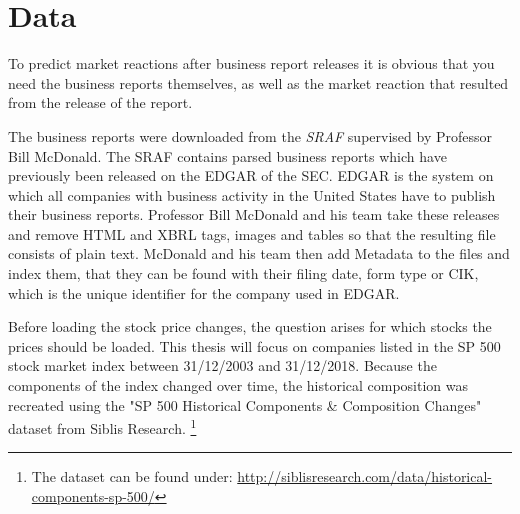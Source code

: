 \chapter{Data}\label{ch:data}

To predict market reactions after business report releases it is obvious that you need the business reports themselves, as well as the market reaction that resulted from the release of the report.

The business reports were downloaded from the \textit{\ac{SRAF}} supervised by Professor Bill McDonald.
The \ac{SRAF} contains parsed business reports which have previously been released on the \ac{EDGAR} of the \ac{SEC}.
\ac{EDGAR} is the system on which all companies with business activity in the United States have to publish their business reports.
Professor Bill McDonald and his team take these releases and remove HTML and \ac{XBRL} tags, images and tables so that the resulting file consists of plain text.
McDonald and his team then add Metadata to the files and index them, that they can be found with their filing date, form type or \ac{CIK}, which is the unique identifier for the company used in \ac{EDGAR}.

Before loading the stock price changes, the question arises for which stocks the prices should be loaded.
This thesis will focus on companies listed in the \ac{SP} 500 stock market index between 31/12/2003 and 31/12/2018.
Because the components of the index changed over time, the historical composition was recreated using the "\ac{SP} 500 Historical Components \& Composition Changes" dataset from Siblis Research. \footnote{The dataset can be found under: \url{http://siblisresearch.com/data/historical-components-sp-500/}}

